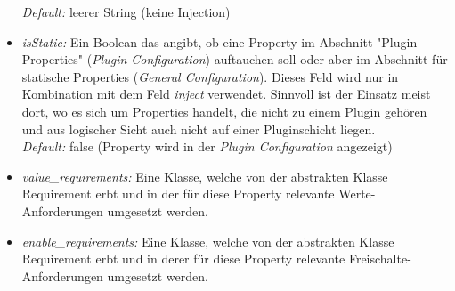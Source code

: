 \documentclass[a4paper, 11pt]{article} %
\begin{document}
\begin{itemize}
	\emph{Default:} leerer String (keine Injection)
	\item \emph{isStatic:} Ein Boolean das angibt, ob eine Property im Abschnitt "Plugin Properties" (\emph{Plugin Configuration}) auftauchen soll oder aber im Abschnitt für statische Properties (\emph{General Configuration}). Dieses Feld wird nur in Kombination mit dem Feld \emph{inject} verwendet. Sinnvoll ist der Einsatz meist dort, wo es sich um Properties handelt, die nicht zu einem Plugin gehören und aus logischer Sicht auch nicht auf einer Pluginschicht liegen.\\
	\emph{Default:} false (Property wird in der \emph{Plugin Configuration} angezeigt)
	\item \emph{value\_requirements:} Eine Klasse, welche von der abstrakten Klasse Requirement erbt und in der für diese Property relevante Werte-Anforderungen umgesetzt werden.
	\item \emph{enable\_requirements:} Eine Klasse, welche von der abstrakten Klasse Requirement erbt und in derer für diese Property relevante Freischalte-Anforderungen umgesetzt werden.
\end{itemize}
\end{document}
